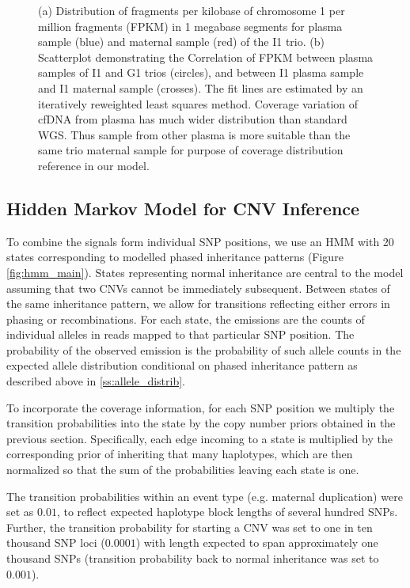 \begin{figure}[h]
{\begin{minipage}[b]{0.45\textwidth}
	\end{minipage}	
}
	
\label{fig:fpkm}
\caption{(a) Distribution of fragments per kilobase of chromosome 1 per million fragments (FPKM) in 1 megabase segments for plasma sample (blue) and maternal sample (red) of the I1 trio. (b) Scatterplot demonstrating the Correlation of FPKM between plasma samples of I1 and G1 trios (circles), and between I1 plasma sample and I1 maternal sample (crosses). The fit lines are estimated by an iteratively reweighted least squares method. Coverage variation of cfDNA from plasma has much wider distribution than standard WGS. Thus sample from other plasma is more suitable than the same trio maternal sample for purpose of coverage distribution reference in our model.  }\label{fig:fpkm}
\end{figure}

\subsection{Hidden Markov Model for CNV Inference}\label{ss:hmm}
To combine the signals form individual SNP positions, we use an HMM with 20 states corresponding to modelled phased inheritance patterns (Figure \ref{fig:hmm_main}). States representing normal inheritance are central to the model assuming that two CNVs cannot be immediately subsequent. Between states of the same inheritance pattern, we allow for transitions reflecting either errors in phasing or recombinations. For each state, the emissions are the counts of individual alleles in reads mapped to that particular SNP position. The probability of the observed emission is the probability of such allele counts in the expected allele distribution conditional on phased inheritance pattern as described above in \ref{ss:allele_distrib}.

To incorporate the coverage information, for each SNP position we multiply the transition probabilities into the state by the copy number priors obtained in the previous section. Specifically, each edge incoming to a state is multiplied by the corresponding prior of inheriting that many haplotypes, which are then normalized so that the sum of the probabilities leaving each state is one. %

The transition probabilities within an event type (e.g. maternal duplication) were set as $0.01$, to reflect expected haplotype block lengths of several hundred SNPs. Further, the transition probability for starting a CNV was set to one in ten thousand SNP loci ($0.0001$) with length expected to span approximately one thousand SNPs (transition probability back to normal inheritance was set to $0.001$).


